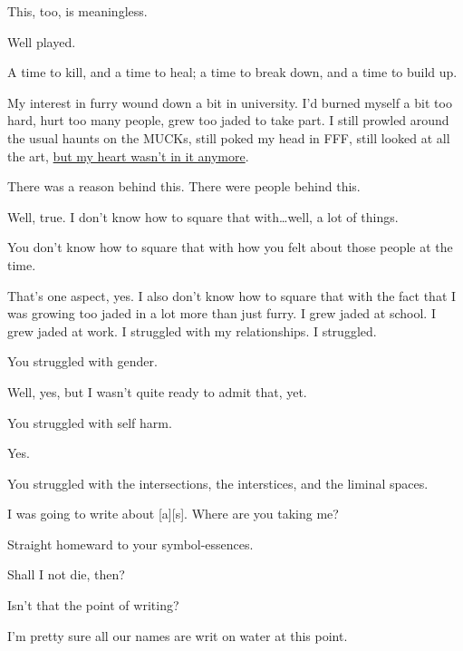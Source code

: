 \begin{paracol}{2}
\begin{leftcolumn}
\begin{ally}
This, too, is meaningless.
\end{ally}
Well played.
\newpage

\noindent A time to kill, and a time to heal; a time to break down, and a time to build up.

My interest in furry wound down a bit in university. I'd burned myself a bit too hard, hurt too many people, grew too jaded to take part. I still prowled around the usual haunts on the MUCKs, still poked my head in FFF, still looked at all the art, \href{https://adjectivespecies.com/2012/03/21/makyos-kaddish/}{but my heart wasn't in it anymore}.

\begin{ally}
There was a reason behind this. There were people behind this.
\end{ally}
Well, true. I don't know how to square that with\ldots{}well, a lot of things.

\begin{ally}
You don't know how to square that with how you felt about those people at the time.
\end{ally}
That's one aspect, yes. I also don't know how to square that with the fact that I was growing too jaded in a lot more than just furry. I grew jaded at school. I grew jaded at work. I struggled with my relationships. I struggled.

\begin{ally}
You struggled with gender.
\end{ally}
Well, yes, but I wasn't quite ready to admit that, yet.

\begin{ally}
You struggled with self harm.
\end{ally}
Yes.

\begin{ally}
You struggled with the intersections, the interstices, and the liminal spaces.
\end{ally}
I was going to write about {[}a{]}{[}s{]}. Where are you taking me?

\begin{ally}
Straight homeward to your symbol-essences.
\end{ally}
Shall I not die, then?

\begin{ally}
Isn't that the point of writing?
\end{ally}
I'm pretty sure all our names are writ on water at this point.


\end{leftcolumn}
\end{paracol}
